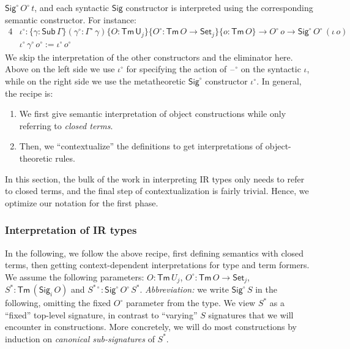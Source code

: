 \documentclass[acmsmall,screen,review,anonymous]{acmart}
\newcommand{\msf}[1]{{\mathsf{#1}}}
\newcommand{\U}{\msf{U}}
\newcommand{\Set}{\msf{Set}}
\newcommand{\Sig}{\msf{Sig}}
\newcommand{\blank}{{\mathord{\hspace{1pt}\text{--}\hspace{1pt}}}}
\newcommand{\Sub}{\msf{Sub}}
\newcommand{\Tm}{\msf{Tm}}
\newcommand{\w}{\circ}
\begin{document}
$\Sig^\w\,O^\w\,t$, and each syntactic $\Sig$ constructor is interpreted using the corresponding
semantic constructor. For instance:
\begin{alignat*}{4}
  &\iota^\w : \{\gamma : \Sub\,\Gamma\}(\gamma^\w : \Gamma^\w\,\gamma)\{O : \Tm\,\U_j\}\{O^\w : \Tm\,O \to \Set_j\}\{o : \Tm\,O\} \to O^\w\,o \to \Sig^\w\,O^\w\,(\iota\,o)\\
  &\iota^\w\,\gamma^\w\,o^\w := \iota^\w\,o^\w
\end{alignat*}
We skip the interpretation of the other constructors and the eliminator here. Above on the left side
we use $\iota^\w$ for specifying the action of $\blank^\w$ on the syntactic $\iota$, while on the
right side we use the metatheoretic $\Sig^\w$ constructor $\iota^\w$. In general, the recipe is:
\begin{enumerate}
\item We first give semantic interpretation of object constructions while only referring to \emph{closed terms}.
\item Then, we ``contextualize'' the definitions to get interpretations of object-theoretic rules.
\end{enumerate}
In this section, the bulk of the work in interpreting IR types only needs to refer to closed terms,
and the final step of contextualization is fairly trivial. Hence, we optimize our notation for the first
phase.

\subsubsection{Interpretation of IR types}

In the following, we follow the above recipe, first defining semantics with closed terms,
then getting context-dependent interpretations for type and term formers.
We assume the following parameters: $O : \Tm\,U_j$, $O^\w : \Tm\,O \to \Set_j$, $S^* :
\Tm\,(\Sig_i\,O)$ and $S^{*\w} : \Sig^\w\,O^\w\,S^*$. \emph{Abbreviation:} we write $\Sig^\w\,S$ in
the following, omitting the fixed $O^\w$ parameter from the type.
We view $S^*$ as a ``fixed'' top-level signature, in contrast to ``varying'' $S$ signatures that we
will encounter in constructions. More concretely, we will do most constructions by induction on
\emph{canonical sub-signatures} of $S^*$.
\end{document}
